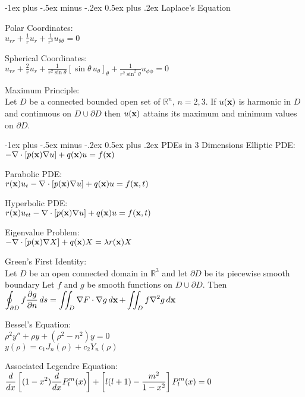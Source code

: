 \documentclass[12pt,landscape]{article}
\makeatletter
\renewcommand{\section}{\@startsection{section}{1}{0mm}%
                                {-1ex plus -.5ex minus -.2ex}%
                                {0.5ex plus .2ex}%
                                {\normalfont\normalsize\bfseries}}
\newcommand{\tab}{\hspace*{1em}}
\newcommand{\ds}{\displaystyle}
\renewcommand{\grad}{\nabla}
\renewcommand{\div}[1]{\nabla\cdot#1}
\theoremstyle{definition}
\makeatother
\begin{document}
\begin{multicols*}{3}
\section{Laplace's Equation}

Polar Coordinates:\\
\tab $\ds u_{rr} + \frac{1}{r}u_r + \frac{1}{r^2} u_{\theta \theta} = 0$

Spherical Coordinates:\\
\tab $\ds u_{rr} + \frac{2}{r}u_r + \frac{1}{r^2 \sin\theta}\left[\sin\theta \,u_\theta\right]_\theta + \frac{1}{r^2\sin^2\theta}u_{\phi\phi} = 0$

Maximum Principle:\\
\tab Let $D$ be a connected bounded open set of $\mathbb{R}^n$, $n = 2, 3$. If $u(\vb{x})$ is harmonic in $D$ and continuous on $D \cup \partial D$ then $u(\vb{x})$ attains its maximum and minimum values on $\partial D$.

\section{PDEs in 3 Dimensions}
Elliptic PDE:\\
\tab $-\div[p(\vb{x})\grad{u}] + q(\vb{x}) u = f(\vb{x})$

Parabolic PDE:\\
\tab $r(\vb{x})u_t -\div[p(\vb{x})\grad{u}] + q(\vb{x}) u = f(\vb{x}, t)$

Hyperbolic PDE:\\
\tab $r(\vb{x})u_{tt} -\div[p(\vb{x})\grad{u}] + q(\vb{x}) u = f(\vb{x}, t)$

Eigenvalue Problem:\\
\tab $-\div[p(\vb{x})\grad{X}] + q(\vb{x}) X = \lambda r(\vb{x})X$

Green's First Identity:\\
\tab Let $D$ be an open connected domain in $\mathbb{R}^3$ and let $\partial D$ be its piecewise smooth boundary Let $f$ and $g$ be smooth functions on $D \cup \partial D$. Then\\
\tab $\ds \oint_{\partial D} f \pdv{g}{n}\mathop{ds} = \iint_{D}\grad{F}\cdot\grad{g}\mathop{d\vb{x}} + \iint_{D} f \grad^2{g}\mathop{d\vb{x}}$

Bessel's Equation:\\
\tab $\rho^2 y'' + \rho y + (\rho^2 -n^2)y = 0$\\
\tab $y(\rho) = c_1 J_n(\rho) + c_2 Y_n(\rho)$

Associated Legendre Equation:\\
\tab $\ds \dv{x}\left[(1-x^2)\dv{x}P_l^m(x)\right] + \left[l(l+1) - \frac{m^2}{1-x^2}\right]P_l^m(x)=0$


\end{multicols*}
\end{document}
